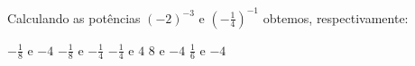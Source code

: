 Calculando as potências $(-2)^{-3}$ e $\left(-\frac{1}{4}\right)^{-1}$ obtemos, respectivamente:

$-\frac{1}{8}$ e $-4$
$-\frac{1}{8}$ e $-\frac{1}{4}$
$-\frac{1}{4}$ e $4$
$8$ e $-4$
$\frac{1}{6}$ e $-4$


